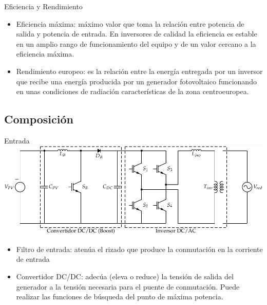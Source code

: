 \documentclass[xcolor={usenames,svgnames,dvipsnames}]{beamer}
\begin{document}
\begin{frame}[label=sec-2-3-3]{Eficiencia y Rendimiento}
\begin{itemize}
\item \alert{Eficiencia máxima}: máximo valor que toma la relación entre potencia
de salida y potencia de entrada. En inversores de calidad la
eficiencia es estable en un amplio rango de funcionamiento del equipo
y de un valor cercano a la eficiencia máxima.

\item \alert{Rendimiento europeo}: es la relación entre la energía entregada por
un inversor que recibe una energía producida por un generador
fotovoltaico funcionando en unas condiciones de radiación
características de la zona centroeuropea.
\end{itemize}
\end{frame}
\subsection{Composición}
\label{sec-2-4}
\begin{frame}[label=sec-2-4-1]{Entrada}
\includegraphics[width=.9\linewidth]{../figs/InversorPV.pdf}

\begin{itemize}
\item \alert{Filtro de entrada}: atenúa el rizado que produce la conmutación en
la corriente de entrada

\item \alert{Convertidor DC/DC}: adecúa (eleva o reduce) la tensión de salida del
generador a la tensión necesaria para el puente de conmutación. Puede
realizar las funciones de búsqueda del punto de máxima potencia.
\end{itemize}
\end{frame}
\end{document}

